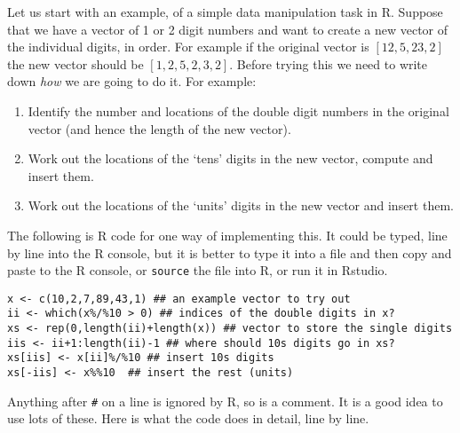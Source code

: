 \documentclass[10pt] {article}
\theoremstyle{definition}
\begin{document}
Let us start with an example, of a simple data manipulation task in R. Suppose that we have a vector of 1 or 2 digit numbers and want to create a new vector of the individual digits, in order. For example if the original vector is $[12,5,23,2]$ the new vector should be $[1,2,5,2,3,2]$. Before trying this we need to write down {\em how} we are going to do it. For example:
\begin{enumerate}
\item Identify the number and locations of the double digit numbers in the original vector (and hence the length of the new vector).
\item Work out the locations of the `tens' digits in the new vector, compute and insert them.
\item Work out the locations of the `units' digits in the new vector and insert them. 
\end{enumerate}
The following is R code for one way of implementing this. It could be typed, line by line into the R console, but it is better to type it into a file and then copy and paste to the R console, or {\tt source} the file into R, or run it in Rstudio. 
\begin{verbatim}
x <- c(10,2,7,89,43,1) ## an example vector to try out
ii <- which(x%/%10 > 0) ## indices of the double digits in x?
xs <- rep(0,length(ii)+length(x)) ## vector to store the single digits
iis <- ii+1:length(ii)-1 ## where should 10s digits go in xs?
xs[iis] <- x[ii]%/%10 ## insert 10s digits
xs[-iis] <- x%%10  ## insert the rest (units)
\end{verbatim}  
Anything after \verb+#+ on a line is ignored by R, so is a comment. It is a good idea to use lots of these. Here is what the code does in detail, line by line.
\end{document}
